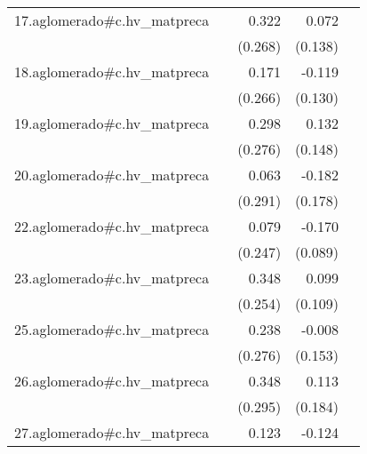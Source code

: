 {\begin{longtable}{l*{4}{D{.}{.}{-1}}}
\addlinespace
17.aglomerado#c.hv\_matpreca&                     &       0.322         &       0.072         &                     \\
            &                     &     (0.268)         &     (0.138)         &                     \\
\addlinespace
18.aglomerado#c.hv\_matpreca&                     &       0.171         &      -0.119         &                     \\
            &                     &     (0.266)         &     (0.130)         &                     \\
\addlinespace
19.aglomerado#c.hv\_matpreca&                     &       0.298         &       0.132         &                     \\
            &                     &     (0.276)         &     (0.148)         &                     \\
\addlinespace
20.aglomerado#c.hv\_matpreca&                     &       0.063         &      -0.182         &                     \\
            &                     &     (0.291)         &     (0.178)         &                     \\
\addlinespace
22.aglomerado#c.hv\_matpreca&                     &       0.079         &      -0.170         &                     \\
            &                     &     (0.247)         &     (0.089)         &                     \\
\addlinespace
23.aglomerado#c.hv\_matpreca&                     &       0.348         &       0.099         &                     \\
            &                     &     (0.254)         &     (0.109)         &                     \\
\addlinespace
25.aglomerado#c.hv\_matpreca&                     &       0.238         &      -0.008         &                     \\
            &                     &     (0.276)         &     (0.153)         &                     \\
\addlinespace
26.aglomerado#c.hv\_matpreca&                     &       0.348         &       0.113         &                     \\
            &                     &     (0.295)         &     (0.184)         &                     \\
\addlinespace
27.aglomerado#c.hv\_matpreca&                     &       0.123         &      -0.124\sym{*}  &                     \\

\end{longtable}}
